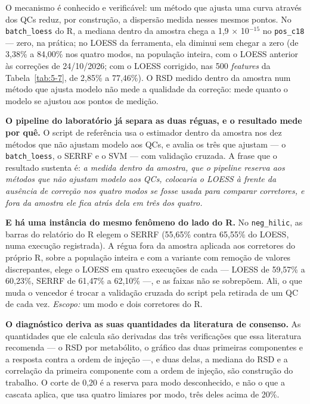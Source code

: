 O mecanismo é conhecido e verificável: um método que ajusta uma curva através dos QCs reduz, por construção, a dispersão medida nesses mesmos pontos. No \texttt{batch\_\allowbreak{}loess} do R, a mediana dentro da amostra chega a 1,9 $\times$ 10$^{-15}$ no \texttt{pos\_\allowbreak{}c18} --- zero, na prática; no LOESS da ferramenta, ela diminui sem chegar a zero (de 3,38\% a 84,00\% nos quatro modos, na população inteira, com o LOESS anterior às correções de 24/10/2026; com o LOESS corrigido, nas 500 \textit{features} da Tabela~\ref{tab:5-7}, de 2,85\% a 77,46\%). O RSD medido dentro da amostra num método que ajusta modelo não mede a qualidade da correção: mede quanto o modelo se ajustou aos pontos de medição.

\textbf{O pipeline do laboratório já separa as duas réguas, e o resultado mede por quê.} O script de referência usa o estimador dentro da amostra nos dez métodos que não ajustam modelo aos QCs, e avalia os três que ajustam --- o \texttt{batch\_\allowbreak{}loess}, o SERRF e o SVM --- com validação cruzada. A frase que o resultado sustenta é: \textit{a medida dentro da amostra, que o pipeline reserva aos métodos que não ajustam modelo aos QCs, colocaria o LOESS à frente da ausência de correção nos quatro modos se fosse usada para comparar corretores, e fora da amostra ele fica atrás dela em três dos quatro.}

\textbf{E há uma instância do mesmo fenômeno do lado do R.} No \texttt{neg\_\allowbreak{}hilic}, as barras do relatório do R elegem o SERRF (55,65\% contra 65,55\% do LOESS, numa execução registrada). A régua fora da amostra aplicada aos corretores do próprio R, sobre a população inteira e com a variante com remoção de valores discrepantes, elege o LOESS em quatro execuções de cada --- LOESS de 59,57\% a 60,23\%, SERRF de 61,47\% a 62,10\% ---, e as faixas não se sobrepõem. Ali, o que muda o vencedor é trocar a validação cruzada do script pela retirada de um QC de cada vez. \textit{Escopo:} um modo e dois corretores do R.

\textbf{O diagnóstico deriva as suas quantidades da literatura de consenso.} As quantidades que ele calcula são derivadas das três verificações que essa literatura recomenda --- o RSD por metabólito, o gráfico das duas primeiras componentes e a resposta contra a ordem de injeção ---, e duas delas, a mediana do RSD e a correlação da primeira componente com a ordem de injeção, são construção do trabalho. O corte de 0,20 é a reserva para modo desconhecido, e não o que a cascata aplica, que usa quatro limiares por modo, três deles acima de 20\%.

